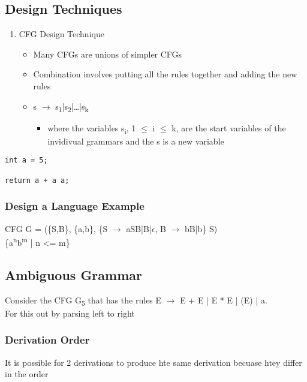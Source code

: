 \documentclass[11pt]{article}
\begin{document}
\subsection{Design Techniques}
\label{sec:orge5ff949}
\begin{enumerate}
\item CFG Design Technique\\
\begin{itemize}
\item Many CFGs are unions of simpler CFGs\\
\item Combination involves putting all the rules together and adding the new rules\\
\item s \(\rightarrow\) s\textsubscript{1}|s\textsubscript{2}|\ldots{}|s\textsubscript{k}\\
\begin{itemize}
\item where the variables s\textsubscript{i}, 1 \(\le\) i \(\le\) k, are the start variables of the invidivual grammars and the s is a new variable\\
\end{itemize}
\end{itemize}
\end{enumerate}

\begin{verbatim}
int a = 5;

return a + a a;
\end{verbatim}
\subsubsection{Design a Language Example}
\label{sec:orge4bb461}
CFG G = (\{S,B\}, \{a,b\}, \{S \(\rightarrow\) aSB|B|\(\epsilon\), B \(\rightarrow\) bB|b\} S)\\

\{a\textsuperscript{n}b\textsuperscript{m} | n <= m\}\\
\subsection{Ambiguous Grammar}
\label{sec:org47149ca}
Consider the CFG G\textsubscript{5} that has the rules E \(\rightarrow\) E + E | E * E | (E) | a.\\

For this out by parsing left to right\\
\subsubsection{Derivation Order}
\label{sec:org9fe573a}
It is possible for 2 derivations to produce hte same derivation becuase htey differ in the order\\
\end{document}
